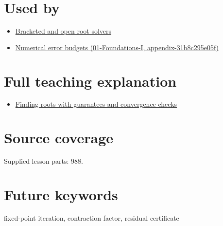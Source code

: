 \section{Used by}\label{appendix-d83b0ad1be7f-used-by}

\begin{itemize}
\tightlist
\item
  \hyperref[appendix-f63eb850796d]{Bracketed and open root solvers}
\item
  \href{../01-Foundations-I/main.pdf\#nameddest=appendix-31b8c295e05f}{Numerical error budgets (01-Foundations-I, appendix-31b8c295e05f)}
\end{itemize}

\section{Full teaching explanation}\label{appendix-d83b0ad1be7f-full-teaching-explanation}

\begin{itemize}
\tightlist
\item
  \href{Continuous\%20Notes/Computing\%20Foundations\%20-\%20From\%20Bits\%20to\%20C++\%20and\%20Systems\%20APIs\#Finding\%20roots\%20with\%20guarantees\%20and\%20convergence\%20checks}{Finding roots with guarantees and convergence checks}
\end{itemize}

\section{Source coverage}\label{appendix-d83b0ad1be7f-source-coverage}

Supplied lesson parts: 988.

\section{Future keywords}\label{appendix-d83b0ad1be7f-future-keywords}

fixed-point iteration, contraction factor, residual certificate
